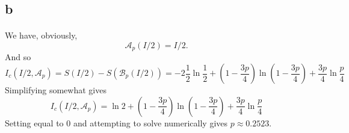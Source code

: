 \documentclass[letterpaper,12pt,oneside,onecolumn]{article}
\newcommand{\cA}{\mathcal{A}} \newcommand{\cB}{\mathcal{B}}
\begin{document}
\subsection{b}
\paragraph{}
We have, obviously, 
$$\cA_p(I/2) = I/2.$$
And so
$$I_c(I/2, \cA_p) = S(I/2) - S(\cB_p(I/2)) = -2\frac{1}{2}\ln\frac{1}{2} + (1-\frac{3p}{4})\ln(1-\frac{3p}{4}) + \frac{3p}{4}\ln\frac{p}{4} $$
Simplifying somewhat gives
$$I_c(I/2, \cA_p) = \ln 2 +(1-\frac{3p}{4})\ln(1-\frac{3p}{4}) +\frac{3p}{4}\ln\frac{p}{4} $$
Setting equal to $0$ and attempting to solve numerically gives $p \approx 0.2523$.
\end{document}
